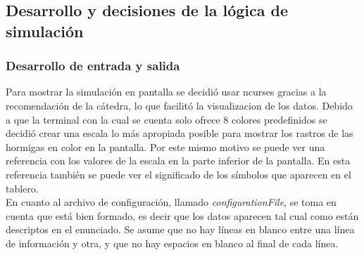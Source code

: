 \documentclass[a4paper,10pt]{article}
\begin{document}
\newpage
\subsection{Desarrollo y decisiones de la lógica de simulación}

\subsubsection{Desarrollo de entrada y salida}
Para mostrar la simulación en pantalla se decidió usar ncurses gracias a la recomendación de la cátedra, lo que facilitó la visualizacion de los 
datos. Debido a que la terminal con la cual se cuenta solo ofrece 8 colores predefinidos se decidió crear una escala lo más apropiada posible 
para mostrar los rastros de las hormigas en color en la pantalla. Por este mismo motivo se puede ver una referencia con los valores de la escala 
en la parte inferior de la pantalla. En esta referencia también se puede ver el significado de los símbolos que aparecen en el tablero.\\
En cuanto al archivo de configuración, llamado \textit{configurationFile}, se toma en cuenta que está bien formado, es decir que los datos 
aparecen tal cual como están descriptos en el enunciado. Se asume que no hay líneas en blanco entre una línea de información y otra, y que no 
hay espacios en blanco al final de cada línea.
\end{document}
